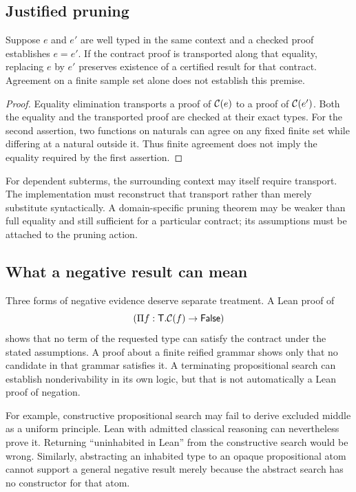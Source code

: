 \subsection{Justified pruning}
\begin{proposition}
Suppose $e$ and $e'$ are well typed in the same context and a checked proof establishes $e=e'$. If the contract proof is transported along that equality, replacing $e$ by $e'$ preserves existence of a certified result for that contract. Agreement on a finite sample set alone does not establish this premise.
\end{proposition}
\begin{proof}
Equality elimination transports a proof of $\mathcal{C}(e)$ to a proof of $\mathcal{C}(e')$. Both the equality and the transported proof are checked at their exact types. For the second assertion, two functions on naturals can agree on any fixed finite set while differing at a natural outside it. Thus finite agreement does not imply the equality required by the first assertion.
\end{proof}
For dependent subterms, the surrounding context may itself require transport. The implementation must reconstruct that transport rather than merely substitute syntactically. A domain-specific pruning theorem may be weaker than full equality and still sufficient for a particular contract; its assumptions must be attached to the pruning action.

\subsection{What a negative result can mean}
Three forms of negative evidence deserve separate treatment. A Lean proof of
\[
  (\Pi f:\mathsf{T}.\mathcal{C}(f)\to\mathsf{False})
\]
shows that no term of the requested type can satisfy the contract under the stated assumptions. A proof about a finite reified grammar shows only that no candidate in that grammar satisfies it. A terminating propositional search can establish nonderivability in its own logic, but that is not automatically a Lean proof of negation.

For example, constructive propositional search may fail to derive excluded middle as a uniform principle. Lean with admitted classical reasoning can nevertheless prove it. Returning ``uninhabited in Lean'' from the constructive search would be wrong. Similarly, abstracting an inhabited type to an opaque propositional atom cannot support a general negative result merely because the abstract search has no constructor for that atom.

